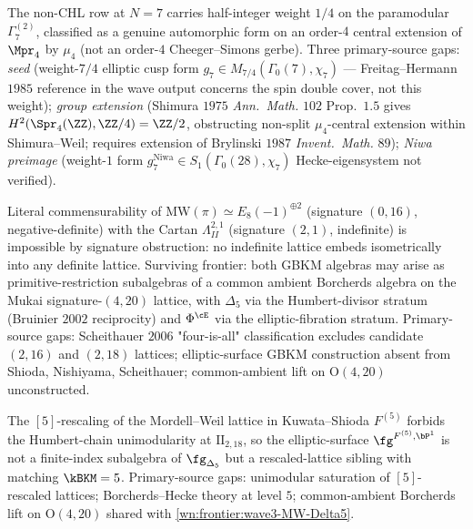 \begin{remark}[Non-CHL $N = 7$ metaplectic extension]
\label{wn:frontier:wave3-N7-metaplectic}\ClaimStatusOpen
The non-CHL row at $N = 7$ carries half-integer weight $1/4$ on the
paramodular $\Gamma^{(2)}_7$, classified as a genuine automorphic form
on an order-$4$ central extension of $\Mpr_4$ by $\mu_4$ (not an
order-$4$ Cheeger--Simons gerbe). Three primary-source gaps:
\emph{seed} (weight-$7/4$ elliptic cusp form
$g_7 \in M_{7/4}(\Gamma_0(7), \chi_7)$ — Freitag--Hermann $1985$
reference in the wave output concerns the spin double cover, not this
weight); \emph{group extension} (Shimura $1975$ \emph{Ann.~Math.} $102$
Prop.~$1.5$ gives $H^2(\Spr_4(\ZZ), \ZZ/4) = \ZZ/2$, obstructing
non-split $\mu_4$-central extension within Shimura--Weil;
requires extension of Brylinski $1987$ \emph{Invent.~Math.} $89$);
\emph{Niwa preimage} (weight-$1$ form $g_7^{\mathrm{Niwa}} \in
S_1(\Gamma_0(28), \chi_7)$ Hecke-eigensystem not verified).
\end{remark}

\begin{remark}
\label{wn:frontier:wave3-MW-Delta5}\ClaimStatusOpen
Literal commensurability of
$\mathrm{MW}(\pi) \simeq E_8(-1)^{\oplus 2}$ (signature $(0, 16)$,
negative-definite) with the Cartan $\Lambda^{2, 1}_{II}$ (signature
$(2, 1)$, indefinite) is impossible by signature obstruction: no
indefinite lattice embeds isometrically into any definite lattice.
Surviving frontier: both GBKM algebras may arise as primitive-restriction
subalgebras of a common ambient Borcherds algebra on the Mukai
signature-$(4, 20)$ lattice, with $\Delta_5$ via the Humbert-divisor
stratum (Bruinier $2002$ reciprocity) and $\Phi^{\cE}$ via the
elliptic-fibration stratum. Primary-source gaps: Scheithauer $2006$
"four-is-all" classification excludes candidate $(2, 16)$ and $(2, 18)$
lattices; elliptic-surface GBKM construction absent from Shioda,
Nishiyama, Scheithauer; common-ambient lift on $\mathrm{O}(4, 20)$
unconstructed.
\end{remark}

\begin{remark}
\label{wn:frontier:wave3-F5-commensurability}\ClaimStatusOpen
The $[5]$-rescaling of the Mordell--Weil lattice in Kuwata--Shioda
$F^{(5)}$ forbids the Humbert-chain unimodularity at
$\mathrm{II}_{2, 18}$, so the elliptic-surface $\fg^{F^{(5)}, \bP^1}$
is not a finite-index subalgebra of $\fg_{\Delta_5}$ but a
rescaled-lattice sibling with matching $\kBKM = 5$. Primary-source
gaps: unimodular saturation of $[5]$-rescaled lattices; Borcherds--Hecke
theory at level $5$; common-ambient Borcherds lift on $\mathrm{O}(4, 20)$
shared with \ref{wn:frontier:wave3-MW-Delta5}.
\end{remark}

